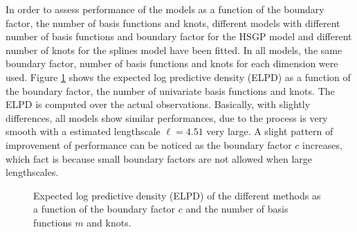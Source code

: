 \documentclass[]{interact}
\theoremstyle{plain}%
\theoremstyle{definition}
\theoremstyle{remark}
\begin{document}
In order to assess performance of the models as a function of the boundary factor, the number of basis functions and knots, different models with different number of basis functions and boundary factor for the HSGP model and different number of knots for the splines model have been fitted. In all models, the same boundary factor, number of basis functions and knots for each dimension were used. Figure \ref{fig19_ELPD_diabetes} shows the expected log predictive density (ELPD) as a function of the boundary factor, the number of univariate basis functions and knots. The ELPD is computed over the actual observations. Basically, with slightly differences, all models show similar performances, due to the process is very smooth with a estimated lengthscale $\ell=4.51$ very large. A slight pattern of improvement of performance can be noticed as the boundary factor $c$ increases, which fact is because small boundary factors are not allowed when large lengthscales.
%
\begin{figure}
\centering
{}
\caption{Expected log predictive density (ELPD) of the different methods as a function of the boundary factor $c$ and the number of basis functions $m$ and knots.}
  \label{fig19_ELPD_diabetes}
\end{figure}
\end{document}
